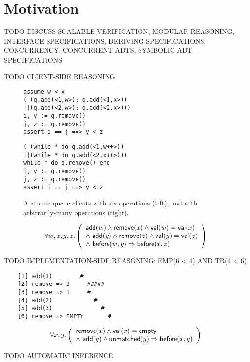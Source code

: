 \section{Motivation}
\label{sec:motivation}

TODO DISCUSS SCALABLE VERIFICATION, MODULAR REASONING, INTERFACE SPECIFICATIONS,
DERIVING SPECIFICATIONS, CONCURRENCY, CONCURRENT ADTS, SYMBOLIC ADT SPECIFICATIONS

TODO CLIENT-SIDE REASONING

\begin{figure}
  \begin{minipage}{0.49\linewidth}
    \begin{verbatim}
assume w < x
( (q.add(<1,w>); q.add(<1,x>))
||(q.add(<2,w>); q.add(<2,x>)))
i, y := q.remove()
j, z := q.remove()
assert i == j ==> y < z
    \end{verbatim}
  \end{minipage}
  \hfill
  \begin{minipage}{0.49\linewidth}
    \begin{verbatim}
( (while * do q.add(<1,w++>))
||(while * do q.add(<2,x++>)))
while * do q.remove() end
i, y := q.remove()
j, z := q.remove()
assert i == j ==> y < z
    \end{verbatim}
  \end{minipage}
  \caption{A atomic queue clients with six operations (left), and with
  arbitrarily-many operations (right).}
  \label{fig:clients}
\end{figure}

\begin{align*}
  \forall w,x,y,z.\left(
    \begin{array}{l}
      {\sf add}(w) \land {\sf remove}(x) \land {\sf val}(w) = {\sf val}(x) \\
      \land\ {\sf add}(y) \land {\sf remove}(z) \land {\sf val}(y) = {\sf val}(z) \\
      \land\ {\sf before}(w,y) \implies {\sf before}(x,z)
    \end{array}
  \right)
\end{align*}

TODO IMPLEMENTATION-SIDE REASONING: EMP(6 < 4) AND TR(4 < 6)

\begin{verbatim}
    [1] add(1)        #
    [2] remove => 3     #####
    [3] remove => 1     #
    [4] add(2)            #
    [5] add(3)              #
    [6] remove => EMPTY       #
\end{verbatim}

\begin{align*}
  \forall x,y.\left(
    \begin{array}{l}
      {\sf remove}(x) \land {\sf val}(x) = {\sf empty} \\
      \land\ {\sf add}(y) \land {\sf unmatched}(y) \implies {\sf before}(x,y)
    \end{array}
  \right)
\end{align*}

TODO AUTOMATIC INFERENCE
